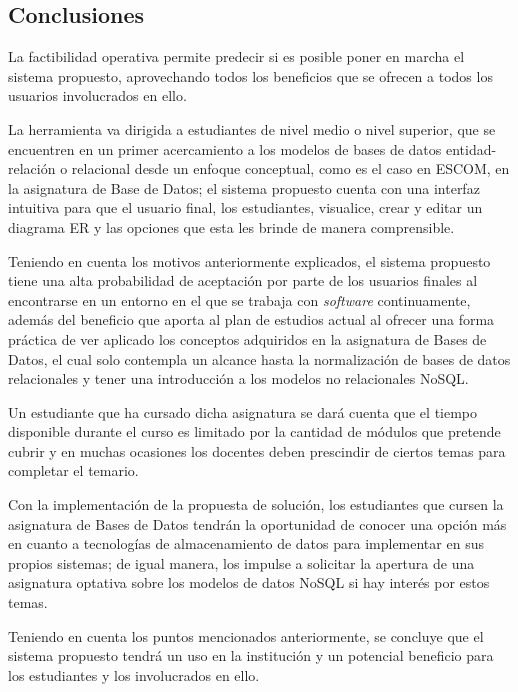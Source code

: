 
\subsection{Conclusiones}


La factibilidad operativa permite predecir si es posible poner en marcha el sistema propuesto, aprovechando todos los beneficios que se ofrecen a todos los usuarios involucrados en ello.


La herramienta va dirigida a estudiantes de nivel medio o nivel superior, que se encuentren en un primer acercamiento a los modelos de bases de datos entidad-relación o relacional desde un enfoque conceptual, como es el caso en ESCOM, en la asignatura de Base de Datos; el sistema propuesto cuenta con una interfaz intuitiva para que el usuario final, los estudiantes, visualice, crear y editar un diagrama ER y las opciones que esta les brinde de manera comprensible.


Teniendo en cuenta los motivos anteriormente explicados, el sistema propuesto tiene una alta probabilidad de aceptación por parte de los usuarios finales al encontrarse en un entorno en el que se trabaja con \textit{software} continuamente, además del beneficio que aporta al plan de estudios actual al ofrecer una forma práctica de ver aplicado los conceptos adquiridos en la asignatura de Bases de Datos, el cual solo contempla un alcance hasta la normalización de bases de datos relacionales y tener una introducción a los modelos no relacionales NoSQL.


Un estudiante que ha cursado dicha asignatura se dará cuenta que el tiempo disponible durante el curso es limitado por la cantidad de módulos que pretende cubrir y en muchas ocasiones los docentes deben prescindir de ciertos temas para completar el temario.


Con la implementación de la propuesta de solución, los estudiantes que cursen la asignatura de Bases de Datos tendrán la oportunidad de conocer una opción más en cuanto a tecnologías de almacenamiento de datos para implementar en sus propios sistemas; de igual manera, los impulse a solicitar la apertura de una asignatura optativa sobre los modelos de datos NoSQL si hay interés por estos temas.


Teniendo en cuenta los puntos mencionados anteriormente, se concluye que el sistema propuesto tendrá un uso en la institución y un potencial beneficio para los estudiantes y los involucrados en ello.


